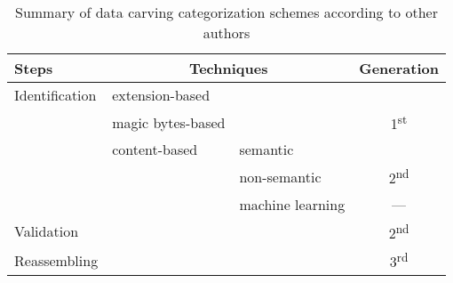\begin{table*}[!ht]
    \centering
    \caption{Summary of data carving categorization schemes according to other authors}
    \label{tab:categories}
    \begin{tabular}{ l | l | l | c }
      Steps & \multicolumn{2}{|c|}{Techniques}                  & Generation\\
      \hline\hline
      Identification    & extension-based   &                   &   \\
                        \cline{2-3}
                        & magic bytes-based &                   & \multirow{-2}{*}{1\textsuperscript{st}}\\
                        \cline{2-4}
                        & content-based     & semantic          &   \\
                                            \cline{3-3}
                        &                   & non-semantic      & \multirow{-2}{*}{2\textsuperscript{nd}}\\
                                            \cline{3-4}
                        &                   & machine learning  &  --- \\
      \hline
      Validation        &                   &                   & 2\textsuperscript{nd} \\
      \hline
      Reassembling      &                   &                   & 3\textsuperscript{rd}\\
      \hline
    \end{tabular}
\end{table*}

